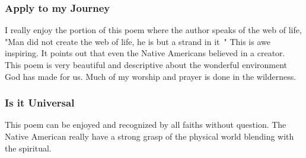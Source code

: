 \documentclass[11pt,a4paper]{scrartcl} %
\begin{document}
\subsubsection{Apply to my Journey}
I really enjoy the portion of this poem where the author speaks of the web of life, "Man did not create the web of life, he is but a strand in it~\citealp{native}" This is awe inspiring. It points out that even the Native Americans believed in a creator. This poem is very beautiful and descriptive about the wonderful environment God has made for us. Much of my worship and prayer is done in the wilderness.
\subsubsection{Is it Universal}
This poem can be enjoyed and recognized by all faiths without question. The Native American really have a strong grasp of the physical world blending with the spiritual. 

\clearpage
    \nocite{*}
    
    
\end{document}
